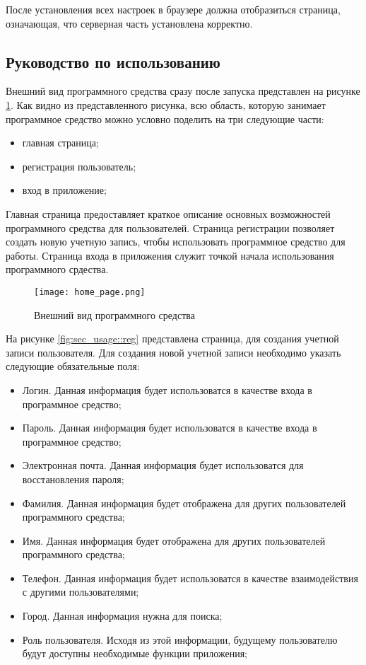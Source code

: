 После установления всех настроек в браузере должна отобразиться страница, означающая, что серверная часть установлена корректно.

\subsection{Руководство по использованию}

Внешний вид программного средства сразу после запуска представлен на рисунке \ref{fig:sec_usage::home_page}. Как видно из представленного рисунка, всю область, которую занимает программное средство можно условно поделить на три следующие части: 

\begin{itemize}
	\item главная страница; 
	\item регистрация пользователь;
	\item вход в приложение;
\end{itemize}

Главная страница предоставляет краткое описание основных возможностей программного средства для пользователей. Страница регистрации позволяет создать новую учетную запись, чтобы использовать программное средство для работы. Страница входа в приложения служит точкой начала использования программного срдества. 

\begin{figure}[!htb]
	\centering
	\texttt{[image: home\_page.png]}
	\caption{ Внешний вид программного средства }
	\label{fig:sec_usage::home_page}
\end{figure}

На рисунке \ref{fig:sec_usage::reg} представлена страница, для создания учетной записи пользователя. Для создания новой учетной записи необходимо указать следующие обязательные поля: 

\begin{itemize}
	\item Логин. Данная информация будет использоватся в качестве входа в программное средство; 
	\item Пароль. Данная информация будет использоватся в качестве входа в программное средство;
	\item Электронная почта. Данная информация будет использоватся для восстановления пароля;
	\item Фамилия. Данная информация будет отображена для других пользователей программного средства;
	\item Имя. Данная информация будет отображена для других пользователей программного средства;
	\item Телефон. Данная информация будет использоватся в качестве взаимодействия с другими пользователями;
	\item Город. Данная информация нужна для поиска;
	\item Роль пользователя. Исходя из этой информации, будущему пользователю будут доступны необходимые функции приложения;
\end{itemize}

